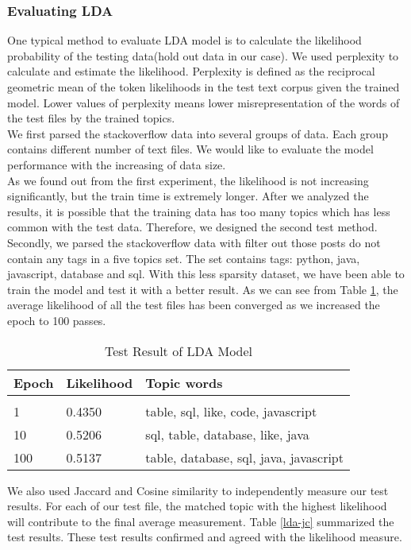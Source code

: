 \subsubsection{Evaluating LDA}
One typical method to evaluate LDA model is to calculate the likelihood probability of the testing data(hold out data in our case). We used perplexity to calculate and estimate the likelihood. Perplexity is defined as the reciprocal geometric mean of the token likelihoods in the test text corpus given the trained model. Lower values of perplexity means lower misrepresentation of the words of the test files by the trained topics.\\ 
We first parsed the stackoverflow data into several groups of data. Each group contains different number of text files. We would like to evaluate the model performance with the increasing of  data size.\\
As we found out from the first experiment, the likelihood is not increasing significantly, but the train time is extremely longer. After we analyzed the results, it is possible that the training data has too many topics which has less common with the test data. Therefore, we designed the second test method.\\
Secondly, we parsed the stackoverflow data with filter out those posts do not contain any tags in a five topics set. The set contains tags: python, java, javascript, database and sql. With this less sparsity dataset, we have been able to train the model and test it with a better result. As we can see from Table \ref{lda-result}, the average likelihood of all the test files has been converged as we increased the epoch to 100 passes.\\
\begin{table}[!htbp]
\caption{Test Result of LDA Model}
\label{lda-result}
\begin{center}
\begin{tabular}{  l  l l}
\bf Epoch & \bf Likelihood & \bf Topic words\\ \hline \\
1         &0.4350 & table, sql, like, code, javascript\\
10       &0.5206 & sql, table, database, like, java\\
100     &0.5137& table, database, sql, java, javascript\\
\end{tabular}
\end{center}
\end{table}
We also used Jaccard and Cosine similarity to independently measure our test results. For each of our test file, the matched topic with the highest likelihood will contribute to the final average measurement. Table \ref{lda-jc} summarized the test results. These test results confirmed and agreed with the likelihood measure. \\
